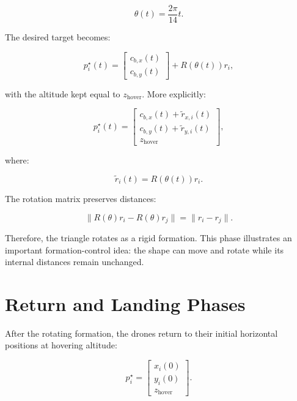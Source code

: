 \begin{equation}
    \theta(t)=\frac{2\pi}{14}t.
\end{equation}

The desired target becomes:

\begin{equation}
    p_i^{\star}(t)=
    \begin{bmatrix}
    c_{b,x}(t) \\
    c_{b,y}(t)
    \end{bmatrix}
    +R(\theta(t))r_i,
\end{equation}

with the altitude kept equal to $z_{\text{hover}}$. More explicitly:

\begin{equation}
    p_i^{\star}(t)=
    \begin{bmatrix}
    c_{b,x}(t)+\tilde{r}_{x,i}(t) \\
    c_{b,y}(t)+\tilde{r}_{y,i}(t) \\
    z_{\text{hover}}
    \end{bmatrix},
\end{equation}

where:

\begin{equation}
    \tilde{r}_i(t)=R(\theta(t))r_i.
\end{equation}

The rotation matrix preserves distances:

\begin{equation}
    \|R(\theta)r_i-R(\theta)r_j\|=\|r_i-r_j\|.
\end{equation}

Therefore, the triangle rotates as a rigid formation. This phase illustrates an important formation-control idea: the shape can move and rotate while its internal distances remain unchanged.

\section{Return and Landing Phases}

After the rotating formation, the drones return to their initial horizontal positions at hovering altitude:

\begin{equation}
    p_i^{\star}=
    \begin{bmatrix}
    x_i(0) \\
    y_i(0) \\
    z_{\text{hover}}
    \end{bmatrix}.
\end{equation}

